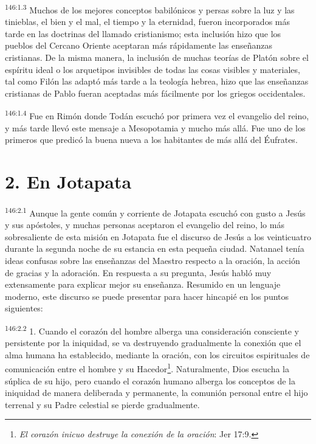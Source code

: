 \par
\textsuperscript{146:1.3} Muchos de los mejores conceptos babilónicos y persas sobre la luz y las tinieblas, el bien y el mal, el tiempo y la eternidad, fueron incorporados más tarde en las doctrinas del llamado cristianismo; esta inclusión hizo que los pueblos del Cercano Oriente aceptaran más rápidamente las enseñanzas cristianas. De la misma manera, la inclusión de muchas teorías de Platón sobre el espíritu ideal o los arquetipos invisibles de todas las cosas visibles y materiales, tal como Filón las adaptó más tarde a la teología hebrea, hizo que las enseñanzas cristianas de Pablo fueran aceptadas más fácilmente por los griegos occidentales.

\par
\textsuperscript{146:1.4} Fue en Rimón donde Todán escuchó por primera vez el evangelio del reino, y más tarde llevó este mensaje a Mesopotamia y mucho más allá. Fue uno de los primeros que predicó la buena nueva a los habitantes de más allá del Éufrates.

\section*{2. En Jotapata}
\par
\textsuperscript{146:2.1} Aunque la gente común y corriente de Jotapata escuchó con gusto a Jesús y sus apóstoles, y muchas personas aceptaron el evangelio del reino, lo más sobresaliente de esta misión en Jotapata fue el discurso de Jesús a los veinticuatro durante la segunda noche de su estancia en esta pequeña ciudad. Natanael tenía ideas confusas sobre las enseñanzas del Maestro respecto a la oración, la acción de gracias y la adoración. En respuesta a su pregunta, Jesús habló muy extensamente para explicar mejor su enseñanza. Resumido en un lenguaje moderno, este discurso se puede presentar para hacer hincapié en los puntos siguientes:

\par
\textsuperscript{146:2.2} 1. Cuando el corazón del hombre alberga una consideración consciente y persistente por la iniquidad, se va destruyendo gradualmente la conexión que el alma humana ha establecido, mediante la oración, con los circuitos espirituales de comunicación entre el hombre y su Hacedor\footnote{\textit{El corazón inicuo destruye la conexión de la oración}: Jer 17:9.}. Naturalmente, Dios escucha la súplica de su hijo, pero cuando el corazón humano alberga los conceptos de la iniquidad de manera deliberada y permanente, la comunión personal entre el hijo terrenal y su Padre celestial se pierde gradualmente.

